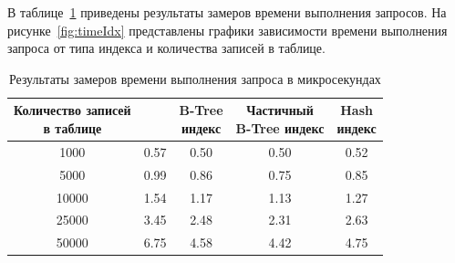 
В таблице~\ref{tab:timeIdx} приведены результаты замеров времени выполнения запросов.
На рисунке~\ref{fig:timeIdx} представлены графики зависимости времени выполнения запроса от типа индекса и количества записей в таблице.

\begin{table}[H]
	\begin{center}
		\begin{center}
			\caption{\label{tab:timeIdx}Результаты замеров времени выполнения запроса в микросекундах}
		\end{center}
		\begin{tabular}{|c|c|c|c|c|}
			\hline 
			\specialcell{Количество записей\\ в таблице} & \specialcell{Без индекса} & \specialcell{B-Tree \\индекс} & \specialcell{Частичный \\B-Tree индекс} & \specialcell{Hash\\ индекс}  \\\hline
		1000 & 0.57 & 		0.50 & 0.50 & 		0.52  \\ \hline
		5000 & 0.99 & 		0.86 & 0.75 & 		0.85  \\ \hline
		10000 & 1.54 & 		1.17 & 1.13 & 		1.27  \\ \hline
		25000 & 3.45 & 		2.48 & 2.31 & 		2.63  \\ \hline
		50000 & 6.75 & 		4.58 & 4.42 & 		4.75  \\ \hline
		\end{tabular}
	\end{center}
\end{table}

